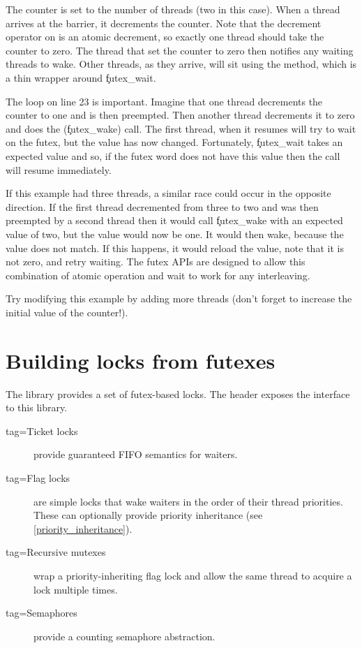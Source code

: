 \codelisting[filename=examples/barrier/barrier.cc,marker=entry,label=lst:barrier,caption="Implementing a barrier with a futex"]{}

The counter is set to the number of threads (two in this case).
When a thread arrives at the barrier, it decrements the counter.
Note that the decrement operator on  is an atomic decrement, so exactly one thread should take the counter to zero.
The thread that set the counter to zero then notifies any waiting threads to wake.
Other threads, as they arrive, will sit using the  method, which is a thin wrapper around \c{futex_wait}.

The loop on line 23 is important.
Imagine that one thread decrements the counter to one and is then preempted.
Then another thread decrements it to zero and does the  (\c{futex_wake}) call.
The first thread, when it resumes will try to wait on the futex, but the value has now changed.
Fortunately, \c{futex_wait} takes an expected value and so, if the futex word does not have this value then the call will resume immediately.

If this example had three threads, a similar race could occur in the opposite direction.
If the first thread decremented from three to two and was then preempted by a second thread then it would call \c{futex_wake} with an expected value of two, but the value would now be one.
It would then wake, because the value does not match.
If this happens, it would reload the value, note that it is not zero, and retry waiting.
The futex APIs are designed to allow this combination of atomic operation and wait to work for any interleaving.

Try modifying this example by adding more threads (don't forget to increase the initial value of the counter!).

\section{Building locks from futexes}

The  library provides a set of futex-based locks.
The  header exposes the interface to this library.

\begin{description}
	\item[tag=Ticket locks]{ provide guaranteed FIFO semantics for waiters.}
	\item[tag=Flag locks]{  are simple locks that wake waiters in the order of their thread priorities.
	      These can optionally provide priority inheritance (see \ref{priority_inheritance}).}
	\item[tag=Recursive mutexes]{ wrap a priority-inheriting flag lock and allow the same thread to acquire a lock multiple times.}
	\item[tag=Semaphores]{ provide a counting semaphore abstraction.}
\end{description}

